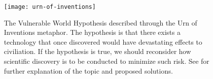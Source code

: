 
%

%

\begin{figure}[h]
  \centering
  \texttt{[image: urn-of-inventions]}
    \caption[The Vulnerable World Hypothesis]{The Vulnerable World Hypothesis described through the Urn of Inventions metaphor. The hypothesis is that there exists a technology that once discovered would have devastating effects to civiliation. If the hypothesis is true, we should reconsider how scientific discovery is to be conducted to minimize such risk. See \citep{bostrom2019} for further explanation of the topic and proposed solutions.}
    \label{fig8:vwh}
\end{figure}
